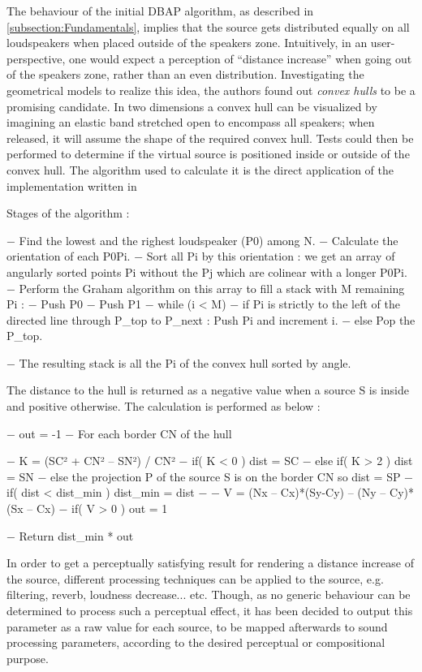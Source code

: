 \documentclass[twoside,10pt]{article}
\begin{document}
The behaviour of the initial DBAP algorithm, as described in \ref{subsection:Fundamentals}, implies that the source gets distributed equally on all loudspeakers when placed outside of the speakers zone. Intuitively, in an user-perspective, one would expect a perception of ``distance increase'' when going out of the speakers zone, rather than an even distribution.
Investigating the geometrical models to realize this idea, the authors found out \textit{convex hulls} to be a promising candidate.
In two dimensions a convex hull can be visualized by imagining an elastic band stretched open to encompass all speakers; when released, it will assume the shape of the required convex hull. Tests could then be performed to determine if the virtual source is positioned inside or outside of the convex hull. 
The algorithm used to calculate it is the direct application of the implementation written in \cite{Rourke:1998_geometry}


	Stages of the algorithm :

−	Find the lowest and the righest loudspeaker (P0) among N.
−	Calculate the orientation of each P0Pi.
−	Sort all Pi by this orientation : we get an array of angularly sorted points Pi without the Pj which are colinear with a longer P0Pi.
−	Perform the Graham algorithm on this array to fill a stack with M remaining Pi :
−	Push P0
−	Push P1
−	while (i < M)
−	if Pi is strictly to the left of the directed line through P_top to P_next : Push Pi and increment i.
−	else Pop the P_top.

−	The resulting stack is all the Pi of the convex hull sorted by angle.

The distance to the hull is returned as a negative value when a source S is inside and positive otherwise. The calculation is performed as below :

−	out = -1
−	For each border CN of the hull

−	K = (SC² + CN² – SN²) / CN²
−	if( K < 0 ) dist = SC
−	else if( K > 2 ) dist = SN
−	else the projection P of the source S is on the border CN so dist = SP
−	if( dist < dist_min ) dist_min = dist
−	
−	V =  (Nx – Cx)*(Sy-Cy) – (Ny – Cy)*(Sx – Cx)
−	if( V > 0 ) out = 1

−	Return dist_min * out

In order to get a perceptually satisfying result for rendering a distance increase of the source, different processing techniques can be applied to the source, e.g. filtering, reverb, loudness decrease... etc. Though, as no generic behaviour can be determined to process such a perceptual effect, it has been decided to output this parameter as a raw value for each source, to be mapped afterwards to sound processing parameters, according to the desired perceptual or compositional purpose. 
\end{document}
